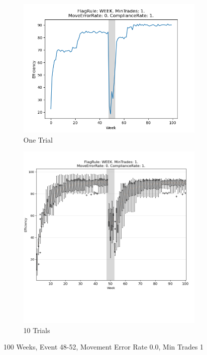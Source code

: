 \documentclass{article}%
\begin{document}
\begin{figure}[!htb]%
\begin{subfigure}[b]{0.45\linewidth}%
\includegraphics[width=\linewidth]{0028fr_WEEK_mt_1_er_0_cr_1_t1.png}%
\caption{One Trial}%
\end{subfigure}%
\begin{subfigure}[b]{0.45\linewidth}%
\includegraphics[clip,width=\linewidth,trim=0 4cm 0 0]{0028fr_WEEK_mt_1_er_0_cr_1_t10.png}%
\caption{10 Trials}%
\end{subfigure}%
\caption{100 Weeks, Event 48{-}52, Movement Error Rate 0.0, Min Trades 1}%
\end{figure}
\end{document}
